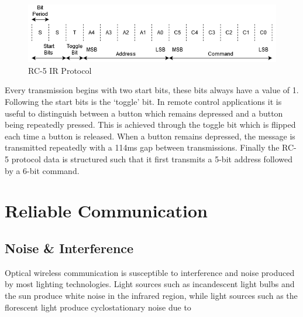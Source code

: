 \begin{figure}[H]
	\centering
	\includegraphics[width=0.8\linewidth]{figures/litreview/rc5_protocol.png}
	\caption{RC-5 IR Protocol}
	\label{fig:rc_5_protocol}
\end{figure}

Every transmission begins with two start bits, these bits always have a value of 1. Following the start bits is the `toggle' bit. In remote control applications it is useful to distinguish between a button which remains depressed and a button being repeatedly pressed. This is achieved through the toggle bit which is flipped each time a button is released. When a button remains depressed, the message is transmitted repeatedly with a 114ms gap between transmissions. Finally the RC-5 protocol data is structured such that it first transmits a 5-bit address followed by a 6-bit command.




\section{Reliable Communication}

\subsection{Noise \& Interference}

Optical wireless communication is susceptible to interference and noise produced by most lighting technologies. Light sources such as incandescent light bulbs and the sun produce white noise in the infrared region, while light sources such as the florescent light produce cyclostationary noise due to 


